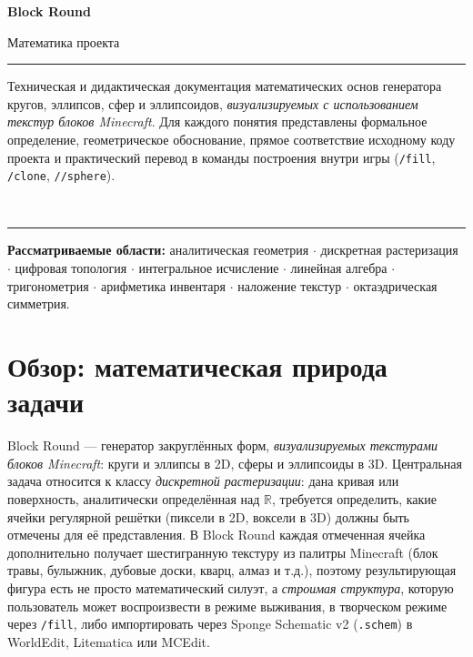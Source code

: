 \documentclass[12pt,a4paper]{scrartcl}
\newcommand{\code}[1]{\texttt{\small #1}}
\newcommand{\cmd}[1]{\textcolor{earth}{\texttt{\small #1}}}
\begin{document}
\begin{titlepage}
  \centering
  \vspace*{3.5cm}
  {\sffamily\bfseries\fontsize{56}{60}\selectfont \color{accent} Block Round\par}
  \vspace{0.7cm}
  {\sffamily\LARGE\color{muted} Математика проекта\par}
  \vspace{1.4cm}
  {\color{rule}\rule{0.6\textwidth}{0.6pt}\par}
  \vspace{0.9cm}
  \begin{minipage}{0.82\textwidth}
    \centering\color{ink}\large
    Техническая и дидактическая документация математических основ генератора кругов, эллипсов, сфер и эллипсоидов, \emph{визуализируемых с использованием текстур блоков Minecraft}. Для каждого понятия представлены формальное определение, геометрическое обоснование, прямое соответствие исходному коду проекта и практический перевод в команды построения внутри игры (\cmd{/fill}, \cmd{/clone}, \cmd{//sphere}).
  \end{minipage}
  \vspace{0.9cm}\\
  {\color{rule}\rule{0.6\textwidth}{0.6pt}\par}
  \vspace{2cm}
  \begin{minipage}{0.78\textwidth}
    \centering\sffamily\small\color{muted}
    \textbf{Рассматриваемые области:} аналитическая геометрия $\cdot$ дискретная растеризация $\cdot$ цифровая топология $\cdot$ интегральное исчисление $\cdot$ линейная алгебра $\cdot$ тригонометрия $\cdot$ арифметика инвентаря $\cdot$ наложение текстур $\cdot$ октаэдрическая симметрия.
  \end{minipage}
\end{titlepage}

\renewcommand{\contentsname}{\color{accent}Содержание}
\tableofcontents
\thispagestyle{fancy}
\newpage

\section{Обзор: математическая природа задачи}

Block Round — генератор закруглённых форм, \emph{визуализируемых текстурами блоков Minecraft}: круги и эллипсы в 2D, сферы и эллипсоиды в 3D. Центральная задача относится к классу \emph{дискретной растеризации}: дана кривая или поверхность, аналитически определённая над $\mathbb{R}$, требуется определить, какие ячейки регулярной решётки (пиксели в 2D, воксели в 3D) должны быть отмечены для её представления. В Block Round каждая отмеченная ячейка дополнительно получает шестигранную текстуру из палитры Minecraft (блок травы, булыжник, дубовые доски, кварц, алмаз и т.д.), поэтому результирующая фигура есть не просто математический силуэт, а \emph{строимая структура}, которую пользователь может воспроизвести в режиме выживания, в творческом режиме через \cmd{/fill}, либо импортировать через Sponge Schematic v2 (\code{.schem}) в WorldEdit, Litematica или MCEdit.
\end{document}
